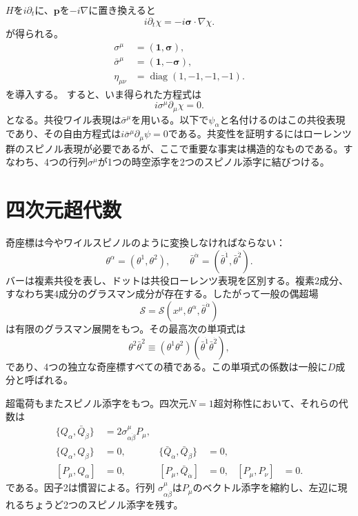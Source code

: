 \(H\)を\(i\partial_t\)に、\(\mathbf p\)を\(-i\nabla\)に置き換えると
\begin{equation}
i\partial_t\chi=-i\boldsymbol{\sigma}\cdot\nabla\chi.
\end{equation}
が得られる。
\begin{equation}
\begin{aligned}
\sigma^\mu&=(\mathbf 1,\boldsymbol{\sigma}),\\
\bar\sigma^\mu&=(\mathbf 1,-\boldsymbol{\sigma}),\\
\eta_{\mu\nu}&=\operatorname{diag}(1,-1,-1,-1).
\end{aligned}
\label{eq:l8-sigma-convention}
\end{equation}
を導入する。
すると、いま得られた方程式は
\begin{equation}
i\sigma^\mu\partial_\mu\chi=0.
\label{eq:l8-weyl-equation}
\end{equation}
となる。共役ワイル表現は\(\bar\sigma^\mu\)を用いる。以下で\(\psi_\alpha\)と名付けるのはこの共役表現であり、その自由方程式は\(i\bar\sigma^\mu\partial_\mu\psi=0\)である。共変性を証明するにはローレンツ群のスピノル表現が必要であるが、ここで重要な事実は構造的なものである。すなわち、4つの行列\(\sigma^\mu\)が1つの時空添字を2つのスピノル添字に結びつける。

\section{四次元超代数}

奇座標は今やワイルスピノルのように変換しなければならない：
\begin{equation}
\theta^\alpha=(\theta^1,\theta^2),
\qquad
\bar\theta^{\dot\alpha}=(\bar\theta^{\dot1},\bar\theta^{\dot2}).
\end{equation}
バーは複素共役を表し、ドットは共役ローレンツ表現を区別する。複素2成分、すなわち実4成分のグラスマン成分が存在する。したがって一般の偶超場
\begin{equation}
\mathcal S=\mathcal S(x^\mu,\theta^\alpha,\bar\theta^{\dot\alpha})
\end{equation}
は有限のグラスマン展開をもつ。その最高次の単項式は
\begin{equation}
\theta^2\bar\theta^2
\equiv
(\theta^1\theta^2)(\bar\theta^{\dot1}\bar\theta^{\dot2}),
\end{equation}
であり、4つの独立な奇座標すべての積である。この単項式の係数は一般に\(D\)成分と呼ばれる。

超電荷もまたスピノル添字をもつ。四次元\(N=1\)超対称性において、それらの代数は
\begin{align}
\{Q_\alpha,\bar Q_{\dot\beta}\}
&=2\sigma^\mu_{\alpha\dot\beta}P_\mu,
\label{eq:l8-superalgebra-main}\\
\{Q_\alpha,Q_\beta\}&=0,
&
\{\bar Q_{\dot\alpha},\bar Q_{\dot\beta}\}&=0,
\label{eq:l8-superalgebra-nilpotent}\\
[P_\mu,Q_\alpha]&=0,
&
[P_\mu,\bar Q_{\dot\alpha}]&=0,
&
[P_\mu,P_\nu]&=0.
\label{eq:l8-superalgebra-commutators}
\end{align}
である。因子2は慣習による。行列
\(\sigma^\mu_{\alpha\dot\beta}\)は\(P_\mu\)のベクトル添字を縮約し、左辺に現れるちょうど2つのスピノル添字を残す。

